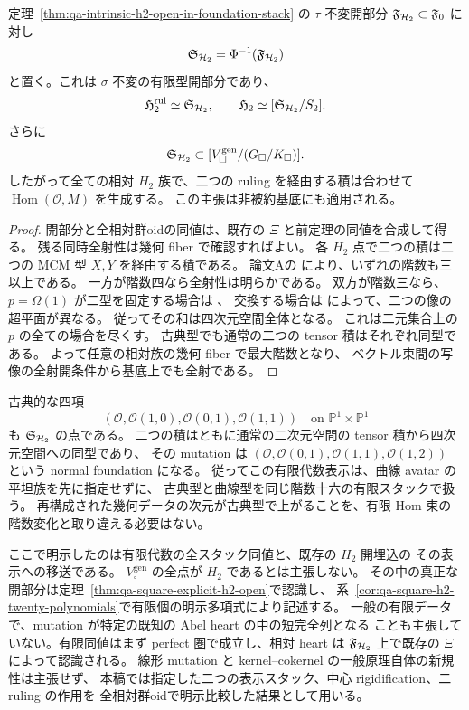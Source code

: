 \begin{corollary}
\label{cor:qa-h2-square-foundation-open}
定理~\ref{thm:qa-intrinsic-h2-open-in-foundation-stack} の
$\tau$ 不変開部分 $\mathfrak F_{\mathcal H_2}\subset\mathfrak F_0$ に対し
\[
 \mathfrak S_{\mathcal H_2}=\Phi^{-1}(\mathfrak F_{\mathcal H_2})
\]
と置く。これは $\sigma$ 不変の有限型開部分であり、
\[
 \mathfrak H_2^{\mathrm{rul}}\simeq\mathfrak S_{\mathcal H_2},\qquad
 \mathfrak H_2\simeq[\mathfrak S_{\mathcal H_2}/S_2].
\]
さらに
\[
 \mathfrak S_{\mathcal H_2}\subset
 [V_\square^{\mathrm{gen}}/(G_\square/K_\square)].
\]
したがって全ての相対 $H_2$ 族で、二つの ruling を経由する積は合わせて
$\operatorname{Hom}(\mathcal O,M)$ を生成する。
この主張は非被約基底にも適用される。
\end{corollary}
\begin{proof}
開部分と全相対群oidの同値は、既存の $\Xi$ と前定理の同値を合成して得る。
残る同時全射性は幾何 fiber で確認すればよい。
各 $H_2$ 点で二つの積は二つの MCM 型 $X,Y$ を経由する積である。
論文Aの\cite[\texttt{cor:normal-cubic-defect}]{QuadricIntrinsic2026}
により、いずれの階数も三以上である。
一方が階数四なら全射性は明らかである。
双方が階数三なら、$p=\Omega(1)$ が二型を固定する場合は
\cite[\texttt{cor:w-distinct-supports}]{QuadricIntrinsic2026}、
交換する場合は
\cite[\texttt{cor:standard-supports-distinct}]{QuadricIntrinsic2026}
によって、二つの像の超平面が異なる。
従ってその和は四次元空間全体となる。
これは二元集合上の $p$ の全ての場合を尽くす。
古典型でも通常の二つの tensor 積はそれぞれ同型である。
よって任意の相対族の幾何 fiber で最大階数となり、
ベクトル束間の写像の全射開条件から基底上でも全射である。
\end{proof}

\begin{remark}[古典型とこの表示の射程]
古典的な四項
\[
 (\mathcal O,\mathcal O(1,0),\mathcal O(0,1),\mathcal O(1,1))
 \quad\text{on }\mathbb P^1\times\mathbb P^1
\]
も $\mathfrak S_{\mathcal H_2}$ の点である。
二つの積はともに通常の二次元空間の tensor 積から四次元空間への同型であり、
その mutation は
$(\mathcal O,\mathcal O(0,1),\mathcal O(1,1),\mathcal O(1,2))$
という normal foundation になる。
従ってこの有限代数表示は、曲線 avatar の平坦族を先に指定せずに、
古典型と曲線型を同じ階数十六の有限スタックで扱う。
再構成された幾何データの次元が古典型で上がることを、有限 Hom 束の
階数変化と取り違える必要はない。

ここで明示したのは有限代数の全スタック同値と、既存の $H_2$ 開埋込の
その表示への移送である。
$V_\square^{\mathrm{gen}}$ の全点が $H_2$ であるとは主張しない。
その中の真正な開部分は定理~\ref{thm:qa-square-explicit-h2-open}で認識し、
系~\ref{cor:qa-square-h2-twenty-polynomials}で有限個の明示多項式により記述する。
一般の有限データで、mutation が特定の既知の Abel heart の中の短完全列となる
ことも主張していない。有限同値はまず perfect 圏で成立し、相対 heart は
$\mathfrak F_{\mathcal H_2}$ 上で既存の $\Xi$ によって認識される。
線形 mutation と kernel--cokernel の一般原理自体の新規性は主張せず、
本稿では指定した二つの表示スタック、中心 rigidification、二 ruling の作用を
全相対群oidで明示比較した結果として用いる。
\end{remark}
